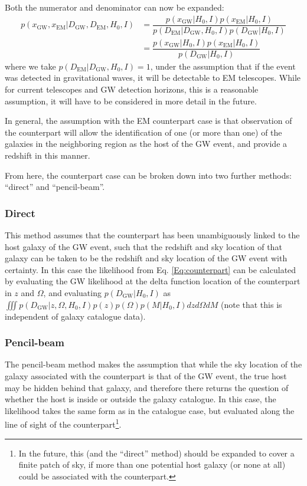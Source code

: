 \documentclass[a4paper,10pt]{article}
\begin{document}
Both the numerator and denominator can now be expanded:
\begin{equation} \label{Eq:counterpart}
\begin{aligned}
p(x_{\text{GW}},x_{\text{EM}}|D_{\text{GW}},D_{\text{EM}},H_0,I) &= \dfrac{p(x_{\text{GW}}|H_0,I) p(x_{\text{EM}}|H_0,I)}{p(D_{\text{EM}}|D_{\text{GW}},H_0,I) p(D_{\text{GW}}|H_0,I)} 
\\ &= \dfrac{p(x_{\text{GW}}|H_0,I) p(x_{\text{EM}}|H_0,I)}{p(D_{\text{GW}}|H_0,I)} 
\end{aligned} 
\end{equation}
where we take $p(D_{\text{EM}}|D_{\text{GW}},H_0,I) = 1$, under the assumption that if the event was detected in gravitational waves, it will be detectable to EM telescopes.  While for current telescopes and GW detection horizons, this is a reasonable assumption, it will have to be considered in more detail in the future.

In general, the assumption with the EM counterpart case is that observation of the counterpart will allow the identification of one (or more than one) of the galaxies in the neighboring region as the host of the GW event, and provide a redshift in this manner.

From here, the counterpart case can be broken down into two further methods: ``direct'' and ``pencil-beam''. 

\subsubsection{Direct}
This method assumes that the counterpart has been unambiguously linked to the host galaxy of the GW event, such that the redshift and sky location of that galaxy can be taken to be the redshift and sky location of the GW event with certainty.  In this case the likelihood from Eq. \ref{Eq:counterpart} can be calculated by evaluating the GW likelihood at the delta function location of the counterpart in $z$ and $\Omega$, and evaluating $p(D_{\text{GW}}|H_0,I)$ as $\iiint p(D_{\text{GW}}|z,\Omega,H_0,I) p(z)p(\Omega)p(M|H_0,I) dz d\Omega dM$ (note that this is independent of galaxy catalogue data).



\subsubsection{Pencil-beam}
The pencil-beam method makes the assumption that while the sky location of the galaxy associated with the counterpart is that of the GW event, the true host may be hidden behind that galaxy, and therefore there returns the question of whether the host is inside or outside the galaxy catalogue.  In this case, the likelihood takes the same form as in the catalogue case, but evaluated along the line of sight of the counterpart\footnote{In the future, this (and the ``direct'' method) should be expanded to cover a finite patch of sky, if more than one potential host galaxy (or none at all) could be associated with the counterpart.}.
\end{document}
